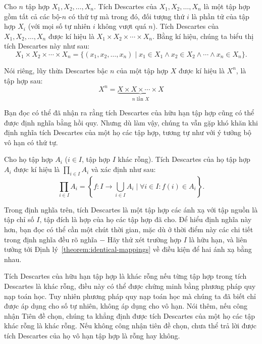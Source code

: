 \begin{definition}
    Cho $n$ tập hợp $X_{1}, X_{2}, \ldots, X_{n}$. Tích Descartes của $X_{1}, X_{2}, \ldots, X_{n}$ là một tập hợp gồm tất cả các bộ-$n$ có thứ tự mà trong đó, đối tượng thứ $i$ là phần tử của tập hợp $X_{i}$ (với mọi số tự nhiên $i$ không vượt quá $n$). Tích Descartes của $X_{1}, X_{2}, \ldots, X_{n}$ được kí hiệu là $X_{1}\times X_{2}\times \cdots \times X_{n}$. Bằng kí hiệu, chúng ta biểu thị tích Descartes này như sau:
    \[
        X_{1}\times X_{2}\times \cdots \times X_{n} = \{ (x_{1}, x_{2}, \ldots, x_{n}) \mid x_{1}\in X_{1} \wedge x_{2}\in X_{2}\wedge \cdots \wedge x_{n}\in X_{n} \}.
    \]

    Nói riêng, lũy thừa Descartes bậc $n$ của một tập hợp $X$ được kí hiệu là $X^{n}$, là tập hợp sau:
    \[
        X^{n} = \underbrace{X\times X\times \cdots \times X}_{\text{$n$ lần $X$}}
    \]
\end{definition}

Bạn đọc có thể đã nhận ra rằng tích Descartes của hữu hạn tập hợp cũng có thể được định nghĩa bằng hồi quy. Nhưng dù làm vậy, chúng ta vẫn gặp khó khăn khi định nghĩa tích Descartes của một họ các tập hợp, tương tự như với ý tưởng bộ vô hạn có thứ tự.

\begin{definition}
    Cho họ tập hợp $A_{i}$ ($i\in I$, tập hợp $I$ khác rỗng). Tích Descartes của họ tập hợp $A_{i}$ được kí hiệu là $\prod_{i\in I}A_{i}$ và xác định như sau:
    \[
        \prod_{i\in I} A_{i} = \left\{ f: I\to \bigcup_{i\in I} A_{i} \mid \forall i\in I: f(i)\in A_{i} \right\}.
    \]
\end{definition}

Trong định nghĩa trên, tích Descartes là một tập hợp các ánh xạ với tập nguồn là tập chỉ số $I$, tập đích là hợp của họ các tập hợp đã cho. Để hiểu định nghĩa này hơn, bạn đọc có thể cần một chút thời gian, mặc dù ở thời điểm này các chi tiết trong định nghĩa đều rõ nghĩa $-$ Hãy thử xét trường hợp $I$ là hữu hạn, và liên tưởng tới Định lý~\ref{theorem:identical-mappings} về điều kiện để hai ánh xạ bằng nhau.

Tích Descartes của hữu hạn tập hợp là khác rỗng nếu từng tập hợp trong tích Descartes là khác rỗng, điều này có thể được chứng minh bằng phương pháp quy nạp toán học. Tuy nhiên phương pháp quy nạp toán học mà chúng ta đã biết chỉ được áp dụng cho số tự nhiên, không áp dụng cho vô hạn. Nói thêm, nếu công nhận Tiên đề chọn, chúng ta khẳng định được tích Descartes của một họ các tập khác rỗng là khác rỗng. Nếu không công nhận tiên đề chọn, chưa thể trả lời được tích Descartes của họ vô hạn tập hợp là rỗng hay không.


